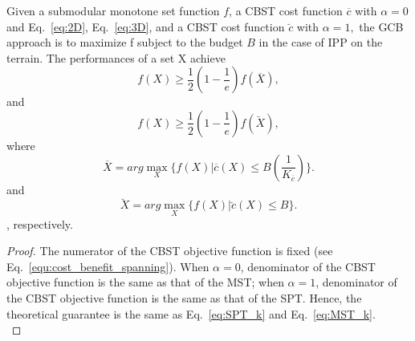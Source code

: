 

\begin{corollary} 
Given a submodular monotone set function $f$, a CBST cost function $\overline{c}$ with $\alpha = 0$ and Eq.~\ref{eq:2D}, Eq.~\ref{eq:3D}, and a CBST cost function $\breve{c}$ with $\alpha = 1,$
the GCB approach is to maximize f subject to the budget $B$ in the case of IPP on the terrain.
The performances of a set X achieve
\begin{equation}
  f(X)\ge\frac{1}{2}(1-\frac{1}{e})f(\overline{X}),
\end{equation}
and
\begin{equation}
  f(X)\ge\frac{1}{2}(1-\frac{1}{e})f(\breve{X}),
\end{equation}
where
\begin{equation}
 \overline{X} = arg\max _X\{
f(X) | \overline{c}(X)\le B (\frac{1}{K_{\overline{c}}})
\}.
\label{eq:OPT_CBST_alpha0}
\end{equation}
and
\begin{equation}
 \breve{X} = arg\max _X\{
f(X) | \breve{c}(X)\le B
\}.
\label{eq:OPT_CBST_alpha1}
\end{equation}
, respectively.
\label{thm:CBSTGCB}
\end{corollary}


\begin{proof}
The numerator of the CBST objective function is fixed (see Eq.~\ref{equ:cost_benefit_spanning}).
When $\alpha=0$, denominator of the CBST objective function is the same as that of the MST;
when $\alpha=1$, denominator of the CBST objective function is the same as that of the SPT.
Hence, the theoretical guarantee is the same as Eq.~\ref{eq:SPT_k} and Eq.~\ref{eq:MST_k}.\\
  
\end{proof}

